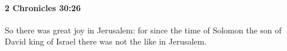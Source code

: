 
		\paragraph{2 Chronicles 30:26} %
			\label{2CHRONICLES-30-26}

			So there was great joy in Jerusalem: for since the time of Solomon the son of David king of Israel there was not the like in Jerusalem.


